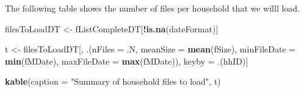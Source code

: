 \documentclass[]{article}
\newenvironment{Shaded}{\begin{snugshade}}{\end{snugshade}}
\newcommand{\KeywordTok}[1]{\textcolor[rgb]{0.13,0.29,0.53}{\textbf{#1}}}
\newcommand{\DataTypeTok}[1]{\textcolor[rgb]{0.13,0.29,0.53}{#1}}
\newcommand{\StringTok}[1]{\textcolor[rgb]{0.31,0.60,0.02}{#1}}
\newcommand{\OperatorTok}[1]{\textcolor[rgb]{0.81,0.36,0.00}{\textbf{#1}}}
\newcommand{\NormalTok}[1]{#1}
\begin{document}
The following table shows the number of files per household that we
willl load.

\begin{Shaded}
\begin{Highlighting}[]
\NormalTok{filesToLoadDT <-}\StringTok{ }\NormalTok{fListCompleteDT[}\OperatorTok{!}\KeywordTok{is.na}\NormalTok{(dateFormat)]}

\NormalTok{t <-}\StringTok{ }\NormalTok{filesToLoadDT[, .(}\DataTypeTok{nFiles =}\NormalTok{ .N,}
                       \DataTypeTok{meanSize =} \KeywordTok{mean}\NormalTok{(fSize),}
                       \DataTypeTok{minFileDate =} \KeywordTok{min}\NormalTok{(fMDate),}
                       \DataTypeTok{maxFileDate =} \KeywordTok{max}\NormalTok{(fMDate)), keyby =}\StringTok{ }\NormalTok{.(hhID)]}

\KeywordTok{kable}\NormalTok{(}\DataTypeTok{caption =} \StringTok{"Summary of household files to load"}\NormalTok{, t)}
\end{Highlighting}
\end{Shaded}
\end{document}
